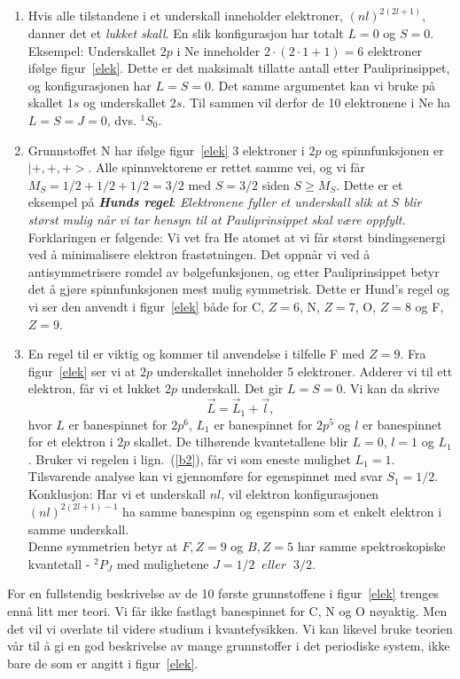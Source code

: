 \begin{enumerate}
%
\item Hvis alle tilstandene i et underskall inneholder elektroner,
$(nl)^{2 (2 l + 1)}$, danner  det et {\sl lukket skall}.
En slik konfigurasjon har totalt $L = 0$ og $S = 0$.\\
Eksempel: Underskallet $2p$ i Ne inneholder
$2 \cdot (2 \cdot 1 + 1 ) = 6$ elektroner if{\o}lge figur~\ref{elek}.
Dette er det maksimalt tillatte  antall etter
Pauliprinsippet, og  konfigurasjonen har $L = S = 0$.
Det samme argumentet kan vi bruke p{\aa} skallet $1s$
og underskallet $2s$. Til sammen vil derfor de 10 elektronene i Ne
ha $L = S = J = 0$, dvs. $^1S_0$.
%
\item Grunnstoffet N har if{\o}lge figur~\ref{elek} 3 elektroner i $2p$
og spinnfunksjonen er $|+, +, +>$. Alle spinnvektorene er rettet
samme vei, og vi f{\aa}r $M_S = 1/2 + 1/2 + 1/2 = 3/2$ med $S = 3/2$
siden $ S \geq M_S$. Dette er et eksempel p{\aa}
{\sl \bf Hunds regel}: {\sl Elektronene fyller et underskall slik at
$S$ blir st{\o}rst mulig n{\aa}r vi tar hensyn til at
Pauliprinsippet skal v{\ae}re oppfylt.}
Forklaringen er f{\o}lgende:
Vi vet fra He atomet at vi f{\aa}r st{\o}rst
bindingsenergi  ved {\aa} minimalisere  elektron
frast{\o}tningen. Det oppn{\aa}r vi ved {\aa} antisymmetrisere
romdel av b{\o}lgefunksjonen, og etter Pauliprinsippet
betyr det {\aa} gj{\o}re  spinnfunksjonen mest mulig symmetrisk.
Dette er Hund's regel og vi ser den anvendt i figur~\ref{elek} b{\aa}de
for  C, $Z = 6$, N, $Z = 7$, O, $Z=8$ og F, $Z = 9$.
%
\item En regel til er viktig og kommer til anvendelse i tilfelle
F med $Z = 9$. Fra figur~\ref{elek} ser vi at $2p$ underskallet
inneholder 5 elektroner. Adderer vi til ett elektron, f{\aa}r
vi et lukket $2p$ underskall. Det gir $L = S = 0$.
Vi kan da skrive
%
\begin{equation}
\vec{L} = \vec{L}_1 + \vec{l},
\label{b13}
\end{equation}
%
hvor $L$ er banespinnet for $2p^6$, $L_1$ er banespinnet
for $2p^5$ og $l$ er banespinnet for et elektron i $2p$
skallet. De tilh{\o}rende kvantetallene blir $L = 0$, $l = 1$
og $L_1$. Bruker vi regelen i lign.~(\ref{b2}), f{\aa}r vi som eneste
mulighet $L_1 = 1$. Tilsvarende analyse kan vi gjennomf{\o}re
for egenspinnet med svar $S_1 = 1/2$.\\
Konklusjon: Har vi et underskall $nl$,
vil elektron konfigurasjonen
$(nl)^{2 (2 l + 1) - 1}$ ha samme banespinn og egenspinn som et enkelt
elektron i samme underskall.\\
Denne symmetrien betyr at $F, Z = 9$ og $B, Z = 5$ har samme
spektroskopiske kvantetall - $^2P_J$ med mulighetene
$J = 1/2 \;\;eller\;\; 3/2$.
%
\end{enumerate}
%
For en fullstendig beskrivelse av de 10 f{\o}rste grunnstoffene
i figur~\ref{elek} trenges enn{\aa} litt mer teori. Vi f{\aa}r ikke fastlagt
banespinnet for C, N og O n{\o}yaktig. Men det vil vi overlate til
videre studium i kvantefysikken. Vi kan likevel bruke teorien v{\aa}r
til {\aa} gi en god beskrivelse av mange grunnstoffer
i det periodiske system, ikke bare de som er angitt i figur~\ref{elek}.

